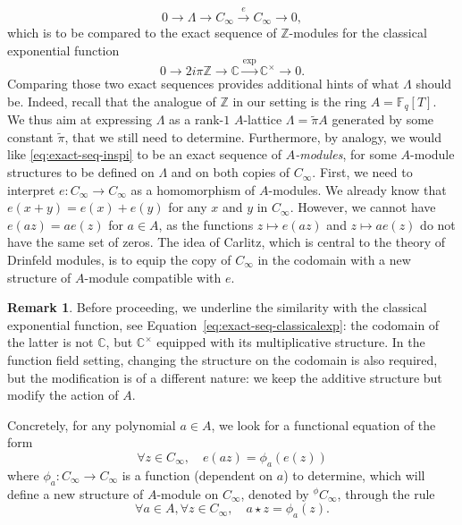 \documentclass[11pt]{article}
\theoremstyle{definition}
\newtheorem{remark}[theorem]{Remark}
\renewcommand{\tilde}{\widetilde}
\newcommand\C{\mathbb{C}}
\newcommand\Fq{\mathbb{F}_q}
\newcommand\Z{\mathbb{Z}}
\newcommand{\Cinf}{C_{\infty}}
\newcommand{\phiact}[1]{{}^\phi\! #1}
\begin{document}
\begin{equation}\label{eq:exact-seq-inspi}
0 \longrightarrow \Lambda \longrightarrow \Cinf \overset{e}{\longrightarrow} \Cinf \longrightarrow 0,
\end{equation}
which is to be compared to the exact sequence of $\Z$-modules
for the classical exponential function
\begin{equation}\label{eq:exact-seq-classicalexp}0 \longrightarrow 2i\pi\Z \longrightarrow \C \overset{\exp}{\longrightarrow} \C^\times \longrightarrow 0.\end{equation}
Comparing those two exact sequences provides additional hints of what $\Lambda$ should be. Indeed, recall that
the analogue of $\Z$ in our setting is the ring $A = \Fq[T]$. We
thus aim at expressing $\Lambda$ as a rank-$1$ $A$-lattice $\Lambda = \tilde\pi A$ generated by some constant $\tilde\pi$, that we still need to determine. 
Furthermore, by analogy, we would like \eqref{eq:exact-seq-inspi} to be an exact sequence of \emph{$A$-modules}, for some $A$-module structures to be defined on $\Lambda$ and on both copies of $\Cinf$. First, we need to interpret $e:\Cinf \to \Cinf$ as a homomorphism of $A$-modules. We already know that $e(x+y)=e(x)+e(y)$ for any $x$ and $y$ in $\Cinf$. However, we cannot have $e(az)=a e(z)$ for $a\in A$, as the functions $z \mapsto e(az)$ and $z \mapsto a e(z)$ do not have the same set of zeros. 
The idea of Carlitz, which is central to the theory of Drinfeld modules, is to equip the copy of $\Cinf$ in the codomain with a new structure of $A$-module compatible with $e$.

\begin{remark}
Before proceeding, we underline the similarity with the classical exponential function,
see Equation~\eqref{eq:exact-seq-classicalexp}: 
the codomain of the latter is not $\C$, but $\C^\times$ equipped with its 
multiplicative structure. In the function field setting, changing the 
structure on the codomain is also required, but the modification is 
of a different nature: we keep the additive structure but modify the action of $A$.
\end{remark}

Concretely, for any polynomial $a\in A$, we look for a functional
equation of the form
\begin{equation}\label{eq:functeqcarlitzexp}\forall z \in \Cinf,\quad e(az) = \phi_a (e(z))\end{equation}
where $\phi_a : \Cinf \to \Cinf$ is a function (dependent on $a$) to 
determine, which will define a new structure of $A$-module
on $C_\infty$, denoted  by $\phiact{\Cinf}$, through the rule
$$\forall a \in A, \forall z \in \Cinf, \quad a \star z = \phi_a(z).$$
\end{document}
